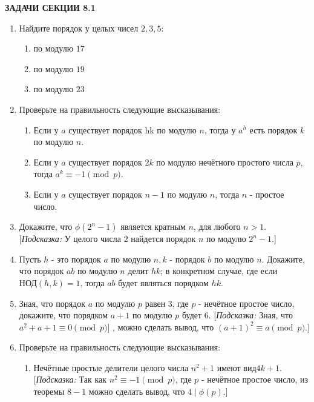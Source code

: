 \documentclass[twoside,12pt]{article}
\begin{document}
\rhead{\textbf{\thepage}}
\begin{center}\textbf{ЗАДАЧИ СЕКЦИИ 8.1}\end{center}
{\footnotesize \begin{enumerate}[label=\textbf{\arabic*.}]
	\item Найдите порядок у целых чисел $2,3,5$: \begin{enumerate}
	   \item по модулю $17$
	   \item по модулю $19$
	   \item по модулю $23$ \end{enumerate}
	\item Проверьте на правильность следующие высказывания:\begin{enumerate}
		\item Если у $a$ существует порядок hk по модулю $n$, тогда у $a^{h}$ есть порядок $k$ по модулю $n$.
		\item Если у $a$ существует порядок $2k$ по модулю нечётного простого числа $p$, тогда $a^{k}\equiv-1 \pmod{p}.$
		\item Если у $a$ существует порядок $n-1$ по модулю $n$, тогда $n$ - простое число. \end{enumerate}
	\item Докажите, что $\phi(2^{n}-1)$ является кратным $n$, для любого $n>1$.
 [\textit{Подсказка:} У целого числа $2$ найдется порядок $n$ по модулю $2^{n}-1$.]
        \item Пусть $h$ - это порядок $a$ по модулю $n, k$ - порядок $b$ по модулю $n$. Докажите, что порядок $ab$ по модулю $n$ делит $hk$; в конкретном случае, где если $\text{НОД}(h,k)=1$, тогда $ab$ будет являться порядком $hk$.
        \item Зная, что порядок $a$ по модулю $p$ равен $3$, где $p$ - нечётное простое число, докажите, что порядком $a+1$ по модулю $p$ будет $6$.
         [\textit{Подсказка:} Зная, что $a^{2}+a+1\equiv0\pmod{p}]$ , можно сделать вывод, что $(a+1)^{2}\equiv a\pmod{p}$.]  
    \item Проверьте на правильность следующие высказывания:\begin{enumerate}
         \item Нечётные простые делители целого числа $n^{2}+1$ имеют вид\break $4k+1$. 
         [\textit{Подсказка:} Так как $n^{2}\equiv-1 \pmod{p}$, где $p$ - нечётное простое число, из теоремы $8-1$ можно сделать вывод, что  $4\mid\phi(p)$.]

\end{enumerate}
\end{enumerate}}
\end{document}
